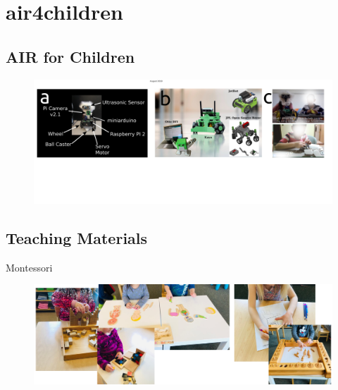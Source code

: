 \section{air4children}

\subsection{AIR for Children}

{
\begin{frame}{}
      \begin{figure}
        \centering
        \includegraphics[width=1.0\textwidth]{./figures/air4children/versions/drawing-v02.png}
      \end{figure}
\end{frame}
}

\subsection{Teaching Materials}


{
\begin{frame}{Montessori}

    \begin{figure}
        \centering
        \includegraphics[width=1.0\textwidth]{./figures/montessori/versions/drawing-v00.png}
      \end{figure}
\end{frame}
}

